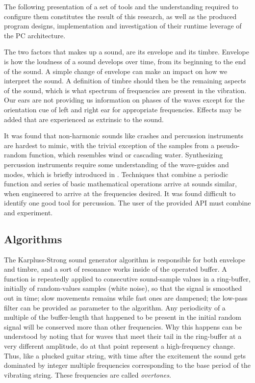 \documentclass{article}
\begin{document}
The following presentation of a set of tools and
the understanding required to configure them
constitutes the result of this research, as well as the
produced program designs, implementation and investigation
of their runtime leverage of the PC architecture.

The two factors that makes up a sound, are its envelope and its
timbre.
Envelope is how the loudness of a sound develops over time,
from its beginning to the end of the sound.
A simple change of envelope can make an impact on how
we interpret the sound.  A definition of timbre should then be the
remaining aspects of the sound, which is what spectrum of frequencies
are present in the vibration.  Our ears are not
providing us information on phases of the waves except for
the orientation cue of left and right ear for appropriate frequencies.
Effects may be added that are experienced as extrinsic to the sound.

It was found that non-harmonic sounds like crashes and percussion
instruments are hardest to mimic, with the trivial exception of
the samples from a pseudo-random function, which resembles wind
or cascading water.
Synthesizing percussion instruments require some understanding of the
wave-guides and modes, which is briefly introduced in \cite{percussion}.
Techniques that combine a periodic function and series of
basic mathematical operations arrive
at sounds similar, when engineered to arrive at the frequencies
desired.
It was found difficult to identify one good tool for percussion.
The user of the provided API must combine and experiment.

\subsection{Algorithms}

The Karpluss-Strong sound generator algorithm is responsible for both envelope
and timbre, and a sort of resonance works inside of the operated buffer.
A function is repeatedly applied to consecutive sound-sample values in a
ring-buffer, initially of random-values samples (white noise),
so that the signal is smoothed out in time; slow movements remains while fast
ones are dampened; the low-pass filter can be provided as parameter to
the algorithm.
Any periodicity of a multiple of the buffer-length that happened to
be present in the initial random signal will be conserved more than other
frequencies.
Why this happens can be understood by noting that for waves that meet their
tail in the ring-buffer at a very different amplitude, do at that point
represent a high-frequency change.
Thus, like a plucked
guitar string, with time after the excitement the sound gets dominated by
integer multiple frequencies corresponding to the base period
of the vibrating string.  These frequencies are called \textit{overtones}.
\end{document}
